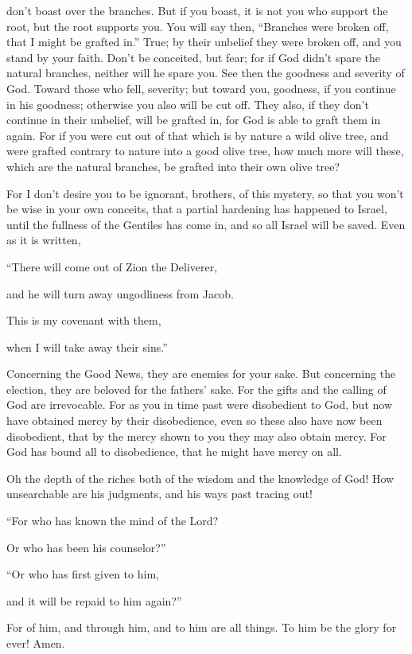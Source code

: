 {don’t boast over the branches. But if you boast, it is not you who support the root, but the root supports you.
You will say then, “Branches were broken off, that I might be grafted in.”
True; by their unbelief they were broken off, and you stand by your faith. Don’t be conceited, but fear;
for if God didn’t spare the natural branches, neither will he spare you.
See then the goodness and severity of God. Toward those who fell, severity; but toward you, goodness, if you continue in his goodness; otherwise you also will be cut off.
They also, if they don’t continue in their unbelief, will be grafted in, for God is able to graft them in again.
For if you were cut out of that which is by nature a wild olive tree, and were grafted contrary to nature into a good olive tree, how much more will these, which are the natural branches, be grafted into their own olive tree?
\par }{\PP {}For I don’t desire you to be ignorant, brothers, of this mystery, so that you won’t be wise in your own conceits, that a partial hardening has happened to Israel, until the fullness of the Gentiles has come in,
and so all Israel will be saved. Even as it is written,
\par }{\Q “There will come out of Zion the Deliverer,
\par }{\QB and he will turn away ungodliness from Jacob.
\par }{\Q {}This is my covenant with them,
\par }{\QB when I will take away their sins.”
\par }{\PP {}Concerning the Good News, they are enemies for your sake. But concerning the election, they are beloved for the fathers’ sake.
For the gifts and the calling of God are irrevocable.
For as you in time past were disobedient to God, but now have obtained mercy by their disobedience,
even so these also have now been disobedient, that by the mercy shown to you they may also obtain mercy.
For God has bound all to disobedience, that he might have mercy on all.
\par }{\PP {}Oh the depth of the riches both of the wisdom and the knowledge of God! How unsearchable are his judgments, and his ways past tracing out!
\par }{\Q {}“For who has known the mind of the Lord?
\par }{\QB Or who has been his counselor?”
\par }{\Q {}“Or who has first given to him,
\par }{\QB and it will be repaid to him again?”
\par }{\PP {}For of him, and through him, and to him are all things. To him be the glory for ever! Amen.

}
